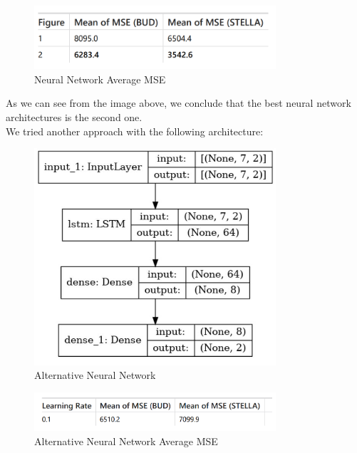         \begin{figure}[H]
            \centering
            \includegraphics[width=0.8\textwidth]{assets/mult6.png}
            \caption{Neural Network Average MSE}
            \label{fig:neural_network}
            \end{figure}

As we can see from the image above, we conclude that the best neural network architectures is the second one.\\


We tried another approach with the following architecture:

\begin{figure}[H]
    \centering
    \includegraphics[width=0.8\textwidth]{assets/mult10.jpeg}
    \caption{Alternative Neural Network}
    \label{fig:neural_network}
    \end{figure}


    \begin{figure}[H]
        \centering
        \includegraphics[width=0.8\textwidth]{assets/mult8.png}
        \caption{Alternative Neural Network Average MSE}
        \label{fig:neural_network}
        \end{figure}
    

